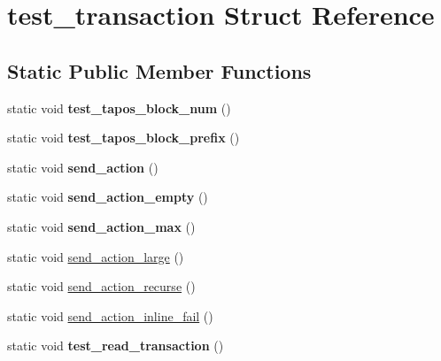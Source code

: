 \hypertarget{structtest__transaction}{}\section{test\+\_\+transaction Struct Reference}
\label{structtest__transaction}
\subsection*{Static Public Member Functions}
\begin{DoxyCompactItemize}
\item 
\mbox{\label{structtest__transaction_a96cdf95777ef3de0f8a4de559f9bb0d4}} 
static void {\bfseries test\+\_\+tapos\+\_\+block\+\_\+num} ()
\item 
\mbox{\label{structtest__transaction_a810bd68332436846e90224c28366a712}} 
static void {\bfseries test\+\_\+tapos\+\_\+block\+\_\+prefix} ()
\item 
\mbox{\label{structtest__transaction_ac46b9f22b6a30fb81051789d0ba2b53a}} 
static void {\bfseries send\+\_\+action} ()
\item 
\mbox{\label{structtest__transaction_acd8f00576b15caacc03d8ceb0f49be07}} 
static void {\bfseries send\+\_\+action\+\_\+empty} ()
\item 
\mbox{\label{structtest__transaction_a6f053360193a1a9fffb13b36eeabc8b0}} 
static void {\bfseries send\+\_\+action\+\_\+max} ()
\item 
static void \mbox{\hyperlink{structtest__transaction_a2d42f72c8017592fd46f82cfe630e6bf}{send\+\_\+action\+\_\+large}} ()
\item 
static void \mbox{\hyperlink{structtest__transaction_adb0f06a5ff3200e418e9d8a622cc27e2}{send\+\_\+action\+\_\+recurse}} ()
\item 
static void \mbox{\hyperlink{structtest__transaction_a69f3404b21d3bfb5e1647c0003f6a8aa}{send\+\_\+action\+\_\+inline\+\_\+fail}} ()
\item 
\mbox{\label{structtest__transaction_a568acd28dc97b11205be3fc8202e53f1}} 
static void {\bfseries test\+\_\+read\+\_\+transaction} ()

\end{DoxyCompactItemize}
